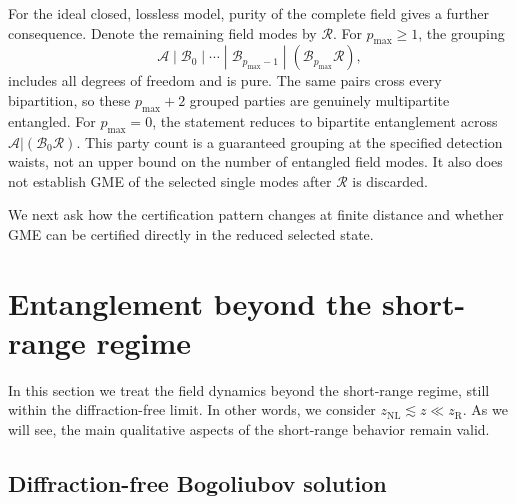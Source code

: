 \documentclass[%
 reprint,
 amsmath,amssymb,
 aps,
pra,
twocolumn,
]{revtex4-2}
\begin{document}
For the ideal closed, lossless model, purity of the complete field gives a further consequence. Denote the remaining field modes by $\mathcal R$. For $p_{\max}\ge1$, the grouping
\begin{equation}
    \mathcal A\;|\;\mathcal B_0\;|\;\cdots\;|\;\mathcal B_{p_{\max}-1}\;|\;(\mathcal B_{p_{\max}}\mathcal R),
    \label{eq:main_grouped_parties}
\end{equation}
includes all degrees of freedom and is pure. The same pairs cross every bipartition, so these $p_{\max}+2$ grouped parties are genuinely multipartite entangled. For $p_{\max}=0$, the statement reduces to bipartite entanglement across $\mathcal A|(\mathcal B_0\mathcal R)$. This party count is a guaranteed grouping at the specified detection waists, not an upper bound on the number of entangled field modes. It also does not establish GME of the selected single modes after $\mathcal R$ is discarded.

We next ask how the certification pattern changes at finite distance and whether GME can be certified directly in the reduced selected state.

\section{Entanglement beyond the short-range regime}
\label{sec:finite_distance}

In this section we treat the field dynamics beyond the short-range regime, still within the diffraction-free limit. In other words, we consider $z_{\mathrm{NL}} \lesssim z \ll z_\mathrm R$. As we will see, the main qualitative aspects of the short-range behavior remain valid.

\subsection{Diffraction-free Bogoliubov solution}
\end{document}
